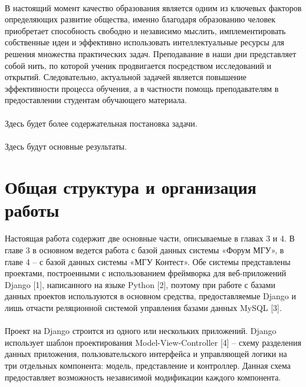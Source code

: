 \documentclass[12pt, a4paper, oneside]{article}
\begin{document}
\paragraph{} %
В настоящий момент качество образования является одним из ключевых факторов определяющих развитие общества, именно благодаря образованию человек приобретает способность свободно и независимо мыслить, имплементировать собственные идеи и эффективно использовать интеллектуальные ресурсы для решения множества практических задач. Преподавание в наши дни представляет собой нить, по которой ученик продвигается посредством исследований и открытий. Следовательно, актуальной задачей является повышение эффективности процесса обучения, а в частности помощь преподавателям в предоставлении студентам обучающего материала.
\paragraph{}
Здесь будет более содержательная постановка задачи.
\paragraph{}
Здесь будут основные результаты.
\newpage

\section{Общая структура и организация работы}
\paragraph{}
Настоящая работа содержит две основные части, описываемые в главах 3 и 4. В главе 3 в основном ведется работа с базой данных системы «Форум МГУ», в главе 4 – с базой данных системы «МГУ Контест». Обе системы представлены проектами, построенными с использованием фреймворка для веб-приложений Django [1], написанного на языке Python [2], поэтому при работе с базами данных проектов используются в основном средства, предоставляемые Django и лишь отчасти реляционной системой управления базами данных MySQL [3].
\paragraph{}
Проект на Django строится из одного или нескольких приложений. Django использует шаблон проектирования Model-View-Controller [4] – схему разделения данных приложения, пользовательского интерфейса и управляющей логики на три отдельных компонента: модель, представление и контроллер. Данная схема предоставляет возможность независимой модификации каждого компонента.
\end{document}
